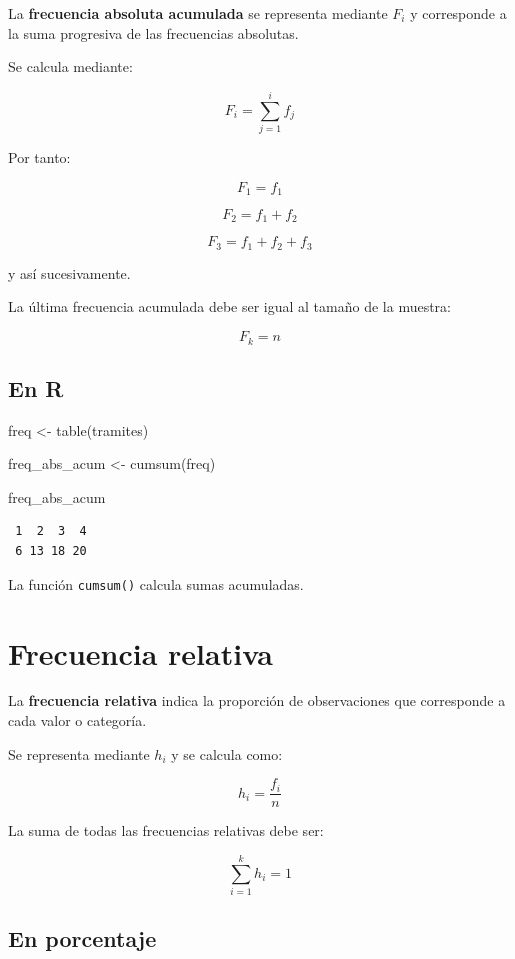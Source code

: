 \documentclass[
  spanish,
  14pt,
  letterpaper,
  DIV=11,
  numbers=noendperiod]{scrartcl}
\newenvironment{Shaded}{\begin{snugshade}}{\end{snugshade}}
\newcommand{\FunctionTok}[1]{\textcolor[rgb]{0.65,0.89,0.18}{#1}}
\newcommand{\NormalTok}[1]{\textcolor[rgb]{0.97,0.97,0.95}{#1}}
\newcommand{\OtherTok}[1]{\textcolor[rgb]{0.65,0.89,0.18}{#1}}
\begin{document}
La \textbf{frecuencia absoluta acumulada} se representa mediante \(F_i\)
y corresponde a la suma progresiva de las frecuencias absolutas.

Se calcula mediante:

\[
F_i=\sum_{j=1}^{i}f_j
\]

Por tanto:

\[
F_1=f_1
\]

\[
F_2=f_1+f_2
\]

\[
F_3=f_1+f_2+f_3
\]

y así sucesivamente.

La última frecuencia acumulada debe ser igual al tamaño de la muestra:

\[
F_k=n
\]

\subsection{En R}\label{en-r}

\begin{Shaded}
\begin{Highlighting}[]
\NormalTok{freq }\OtherTok{\textless{}{-}} \FunctionTok{table}\NormalTok{(tramites)}

\NormalTok{freq\_abs\_acum }\OtherTok{\textless{}{-}} \FunctionTok{cumsum}\NormalTok{(freq)}

\NormalTok{freq\_abs\_acum}
\end{Highlighting}
\end{Shaded}

\begin{verbatim}
 1  2  3  4 
 6 13 18 20 
\end{verbatim}

La función \texttt{cumsum()} calcula sumas acumuladas.

\section{Frecuencia relativa}\label{frecuencia-relativa}

La \textbf{frecuencia relativa} indica la proporción de observaciones
que corresponde a cada valor o categoría.

Se representa mediante \(h_i\) y se calcula como:

\[
h_i=\frac{f_i}{n}
\]

La suma de todas las frecuencias relativas debe ser:

\[
\sum_{i=1}^{k}h_i=1
\]

\subsection{En porcentaje}\label{en-porcentaje}
\end{document}
